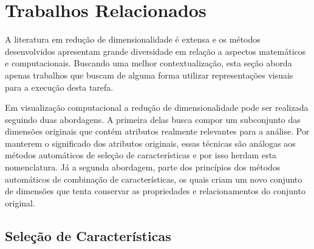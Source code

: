 \section{Trabalhos Relacionados}\label{sec:rel}

A literatura em redução de dimensionalidade é extensa e os métodos desenvolvidos apresentam grande diversidade em relação a aspectos matemáticos e computacionais. Buscando uma melhor contextualização, esta seção aborda apenas trabalhos que buscam de alguma forma utilizar representações visuais para a execução desta tarefa.

Em visualização computacional a redução de dimensionalidade pode ser realizada seguindo duas abordagens. A primeira delas busca compor um subconjunto das dimensões originais que contém atributos realmente relevantes para a análise. Por manterem o significado dos atributos originais, essas técnicas são análogas aos métodos automáticos de seleção de características e por isso herdam esta nomenclatura. Já a segunda abordagem, parte dos princípios dos métodos automáticos de combinação de características, os quais criam um novo conjunto de dimensões que tenta conservar as propriedades e relacionamentos do conjunto original.

\subsection{Seleção de Características}



